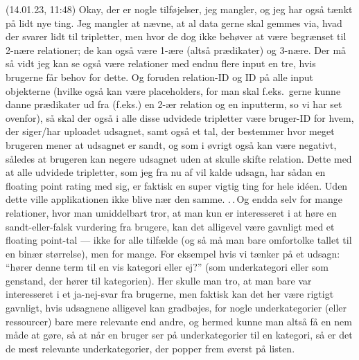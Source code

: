 \documentclass{report}
\begin{document}
(14.01.23, 11:48) Okay, der er nogle tilføjelser, jeg mangler, og jeg har også tænkt på lidt nye ting. Jeg mangler at nævne, at al data gerne skal gemmes via, hvad der svarer lidt til tripletter, men hvor de dog ikke behøver at være begrænset til 2-nære relationer; de kan også være 1-ære (altså prædikater) og 3-nære. Der må så vidt jeg kan se også være relationer med endnu flere input en tre, hvis brugerne får behov for dette. Og foruden relation-ID og ID på alle input objekterne (hvilke også kan være placeholders, for man skal f.eks.\ gerne kunne danne prædikater ud fra (f.eks.) en 2-ær relation og en inputterm, so vi har set ovenfor), så skal der også i alle disse udvidede tripletter være bruger-ID for hvem, der siger/har uploadet udsagnet, samt også et tal, der bestemmer hvor meget brugeren mener at udsagnet er sandt, og som i øvrigt også kan være negativt, således at brugeren kan negere udsagnet uden at skulle skifte relation. Dette med at alle udvidede tripletter, som jeg fra nu af vil kalde udsagn, har sådan en floating point rating med sig, er faktisk en super vigtig ting for hele idéen. Uden dette ville applikationen ikke blive nær den samme. .\,.\,Og endda selv for mange relationer, hvor man umiddelbart tror, at man kun er interesseret i at høre en sandt-eller-falsk vurdering fra brugere, kan det alligevel være gavnligt med et floating point-tal --- ikke for alle tilfælde (og så må man bare omfortolke tallet til en binær størrelse), men for mange. For eksempel hvis vi tænker på et udsagn: ``hører denne term til en vis kategori eller ej?'' (som underkategori eller som genstand, der hører til kategorien). Her skulle man tro, at man bare var interesseret i et ja-nej-svar fra brugerne, men faktisk kan det her være rigtigt gavnligt, hvis udsagnene alligevel kan gradbøjes, for nogle underkategorier (eller ressourcer) bare mere relevante end andre, og hermed kunne man altså få en nem måde at gøre, så at når en bruger ser på underkategorier til en kategori, så er det de mest relevante underkategorier, der popper frem øverst på listen. 
\end{document}
